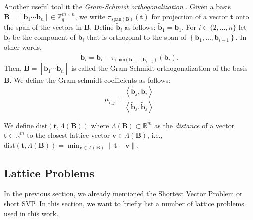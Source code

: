 Another useful tool it the \textit{Gram-Schmidt orthogonalization} \label{sec:gram-schmidt}. Given a basis $\mathbf{B} = \left[\mathbf{b}_1 \cdots \mathbf{b}_n\right] \in \mathbb{Z}_q^{m\times n}$, we write $\pi_{\text{span}(\mathbf{B})}(\mathbf{t})$ for projection of a vector $\mathbf{t}$ onto the span of the vectors in $\mathbf{B}$.
Define $\tilde{\mathbf{b}}_i$ as follows: $\tilde{\mathbf{b}}_1 = \mathbf{b}_1$. For $i \in \{2, \ldots, n\}$ let $\tilde{\mathbf{b}}_i$ be the component of $\mathbf{b}_i$ that is orthogonal to the span of $\left\{\mathbf{b}_1, \ldots, \mathbf{b}_{i-1}\right\}$. In other words,
\begin{equation}
    \tilde{\mathbf{b}}_i = \mathbf{b}_i - \pi_{\text{span}(\mathbf{b}_1, \ldots, \mathbf{b}_{i-1})}(\mathbf{b}_i).
\end{equation} %
Then,  $\tilde{\mathbf{B}} = \left[\tilde{\mathbf{b}}_1 \cdots \tilde{\mathbf{b}}_n\right]$ is called the Gram-Schmidt orthogonalization of the basis $\mathbf{B}$. We define the Gram-schmidt coefficients as follows:
\begin{equation}
    \mu_{i, j} = \frac{\left\langle \tilde{\mathbf{b}}_j, \mathbf{b}_i\right\rangle}{\left\langle \tilde{\mathbf{b}}_j, \tilde{\mathbf{b}}_j\right\rangle}
\end{equation}


We define $\text{dist}(\mathbf{t}, \Lambda(\mathbf{B}))$ where $\Lambda(\mathbf{B}) \subset \mathbb{R}^m$ as the \textit{distance} of a vector $\mathbf{t} \in \mathbb{R}^m$ to the closest lattice vector $\mathbf{v} \in \Lambda(\mathbf{B})$, i.e., $\text{dist}(\mathbf{t}, \Lambda(\mathbf{B})) = \min_{\mathbf{v} \in \Lambda(\mathbf{B})}\|\mathbf{t} -  \mathbf{v}\|$.






\subsection{Lattice Problems}\label{sec:lattice-problems}
In the previous section, we already mentioned the Shortest Vector Problem or short SVP. In this section, we want to briefly list a number of lattice problems used in this work.

